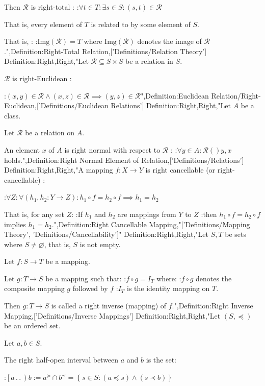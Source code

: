 Then $\mathcal R$ is right-total :
:$\forall t \in T: \exists s \in S: \left( s, t \right) \in \mathcal R$


That is,  every element of $T$ is related to by some element of $S$.


That is, :
:$\mathrm {Img} \left( \mathcal R \right) = T$
where $\mathrm {Img} \left( \mathcal R \right)$ denotes the image of $\mathcal R$.",Definition:Right-Total Relation,['Definitions/Relation Theory']
Definition:Right,Right,"Let $\mathcal R \subseteq S \times S$ be a relation in $S$.


$\mathcal R$ is right-Euclidean :

:$\left( x, y \right) \in \mathcal R \land \left( x, z \right) \in \mathcal R \implies \left( y, z \right) \in \mathcal R$",Definition:Euclidean Relation/Right-Euclidean,['Definitions/Euclidean Relations']
Definition:Right,Right,"Let $A$ be a class.

Let $\mathcal R$ be a relation on $A$.


An element $x$ of $A$ is right normal with respect to $\mathcal R$ :
:$\forall y \in A: \mathcal R \left(   \right){y, x}$ holds.",Definition:Right Normal Element of Relation,['Definitions/Relations']
Definition:Right,Right,"A mapping $f: X \to Y$ is right cancellable (or right-cancellable) :

:$\forall Z: \forall \left( h_1, h_2: Y \to Z \right): h_1 \circ f = h_2 \circ f \implies h_1 = h_2$

That is,  for any set $Z$:
:If $h_1$ and $h_2$ are mappings from $Y$ to $Z$
:then $h_1 \circ f = h_2 \circ f$ implies $h_1 = h_2$.",Definition:Right Cancellable Mapping,"['Definitions/Mapping Theory', 'Definitions/Cancellability']"
Definition:Right,Right,"Let $S, T$ be sets where $S \ne \varnothing$, that is, $S$ is not empty.

Let $f: S \to T$ be a mapping.


Let $g: T \to S$ be a mapping such that:
:$f \circ g = I_T$
where:
:$f \circ g$ denotes the composite mapping $g$ followed by $f$
:$I_T$ is the identity mapping on $T$.


Then $g: T \to S$ is called a right inverse (mapping) of $f$.",Definition:Right Inverse Mapping,['Definitions/Inverse Mappings']
Definition:Right,Right,"Let $\left( S, \preccurlyeq \right)$ be an ordered set.

Let $a, b \in S$.


The right half-open interval between $a$ and $b$ is the set:

:$\left[ a \,.\,.\,   \right)b := a^\succcurlyeq \cap b^\prec = \left\lbrace s \in S: \left( a \preccurlyeq s \right) \land \left( s \prec b \right)  \right\rbrace$

